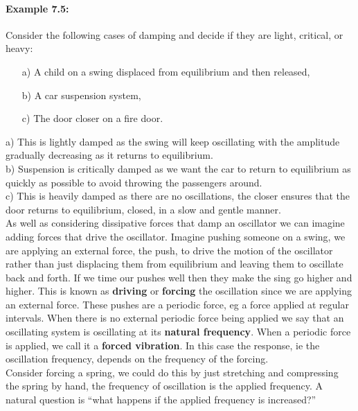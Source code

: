 \documentclass[a4paper,12pt]{book}
\begin{document}
\paragraph{Example 7.5:} Consider the following cases of damping and decide if they are light, critical, or heavy:
\begin{itemize}
\setlength{\itemsep}{-5pt}
    \item[a)] A child on a swing displaced from equilibrium and then released,
    \item[b)] A car suspension system,
    \item[c)] The door closer on a fire door.
\end{itemize}  

a) This is lightly damped as the swing will keep oscillating with the amplitude gradually decreasing as it returns to equilibrium. \\

b) Suspension is critically damped as we want the car to return to equilibrium as quickly as possible to avoid throwing the passengers around.\\

c) This is heavily damped as there are no oscillations, the closer ensures that the door returns to equilibrium, closed, in a slow and gentle manner.\\


As well as considering dissipative forces that damp an oscillator we can imagine adding forces that drive the oscillator. Imagine pushing someone on a swing, we are applying an external force, the push, to drive the motion of the oscillator rather than just displacing them from equilibrium and leaving them to oscillate back and forth. If we time our pushes well then they make the sing go higher and higher. This is known as \textbf{driving} or \textbf{forcing} the oscillation since we are applying an external force. These pushes are a periodic force, eg a force applied at regular intervals. When there is no external periodic force being applied we say that an oscillating system is oscillating at its \textbf{natural frequency}. When a periodic force is applied, we call it a \textbf{forced vibration}. In this case the response, ie the oscillation frequency, depends on the frequency of the forcing.\\

Consider forcing a spring, we could do this by just stretching and compressing the spring by hand, the frequency of oscillation is the applied frequency. A natural question is ``what happens if the applied frequency is increased?'' 
\end{document}
